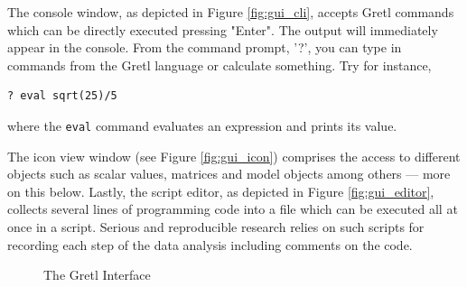 \documentclass[11pt]{article}
\begin{document}
The console window, as depicted in Figure \ref{fig:gui_cli}, accepts Gretl commands which can be directly executed pressing "Enter". The output will immediately appear in the console. From the command prompt, '?', you can type in commands from the Gretl language or calculate something. Try for instance,
\begin{verbatim}
? eval sqrt(25)/5
\end{verbatim}
where the \texttt{eval} command evaluates an expression and prints its value.

The icon view window (see Figure \ref{fig:gui_icon}) comprises the access to different objects such as scalar values, matrices and model objects among others --- more on this below. Lastly, the script editor, as depicted in Figure \ref{fig:gui_editor}, collects several lines of programming code into a file which can be executed all at once in a script. Serious and reproducible research relies on such scripts for recording each step of the data analysis including comments on the code.


\begin{figure}[h!]
	\centering
	
	
	\caption{The Gretl Interface}
	\label{fig:GUI}
\end{figure}
\end{document}

